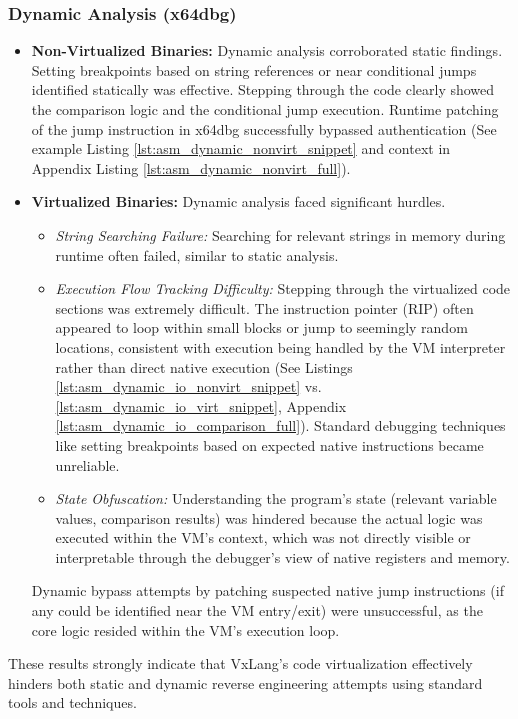 \subsubsection{Dynamic Analysis (x64dbg)}
\begin{itemize}
	\item \textbf{Non-Virtualized Binaries:} Dynamic analysis corroborated static findings. Setting breakpoints based on string references or near conditional jumps identified statically was effective. Stepping through the code clearly showed the comparison logic and the conditional jump execution. Runtime patching of the jump instruction in x64dbg successfully bypassed authentication (See example Listing \ref{lst:asm_dynamic_nonvirt_snippet} and context in Appendix Listing \ref{lst:asm_dynamic_nonvirt_full}).
	\item \textbf{Virtualized Binaries:} Dynamic analysis faced significant hurdles.
	      \begin{itemize}
		      \item \textit{String Searching Failure:} Searching for relevant strings in memory during runtime often failed, similar to static analysis.
		      \item \textit{Execution Flow Tracking Difficulty:} Stepping through the virtualized code sections was extremely difficult. The instruction pointer (RIP) often appeared to loop within small blocks or jump to seemingly random locations, consistent with execution being handled by the VM interpreter rather than direct native execution (See Listings \ref{lst:asm_dynamic_io_nonvirt_snippet} vs. \ref{lst:asm_dynamic_io_virt_snippet}, Appendix \ref{lst:asm_dynamic_io_comparison_full}). Standard debugging techniques like setting breakpoints based on expected native instructions became unreliable.
		      \item \textit{State Obfuscation:} Understanding the program's state (relevant variable values, comparison results) was hindered because the actual logic was executed within the VM's context, which was not directly visible or interpretable through the debugger's view of native registers and memory.
	      \end{itemize}
	      Dynamic bypass attempts by patching suspected native jump instructions (if any could be identified near the VM entry/exit) were unsuccessful, as the core logic resided within the VM's execution loop.
\end{itemize}

These results strongly indicate that VxLang's code virtualization effectively hinders both static and dynamic reverse engineering attempts using standard tools and techniques.

